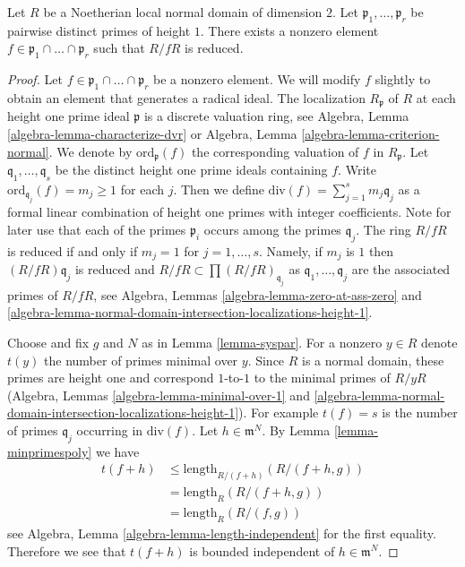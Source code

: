 \begin{lemma}
\label{lemma-radical-element}
Let $R$ be a Noetherian local normal domain of dimension $2$.
Let $\mathfrak p_1, \ldots, \mathfrak p_r$ be pairwise distinct
primes of height $1$. There exists a nonzero element
$f \in \mathfrak p_1 \cap \ldots \cap \mathfrak p_r$ such
that $R/fR$ is reduced.
\end{lemma}

\begin{proof}
Let $f \in \mathfrak p_1 \cap \ldots \cap \mathfrak p_r$ be a nonzero element.
We will modify $f$ slightly to obtain an element that generates a radical ideal.
The localization $R_\mathfrak p$ of $R$ at each height one prime
ideal $\mathfrak p$ is a discrete valuation ring, see
Algebra, Lemma \ref{algebra-lemma-characterize-dvr} or
Algebra, Lemma \ref{algebra-lemma-criterion-normal}.
We denote by $\text{ord}_\mathfrak p(f)$ the corresponding
valuation of $f$ in $R_{\mathfrak p}$. Let
$\mathfrak q_1, \ldots, \mathfrak q_s$
be the distinct height one prime ideals containing $f$.
Write $\text{ord}_{\mathfrak q_j}(f) = m_j \geq 1$ for each $j$.
Then we define $\text{div}(f) = \sum_{j = 1}^s m_j\mathfrak q_j$
as a formal linear combination of
height one primes with integer coefficients.
Note for later use that each of the primes $\mathfrak p_i$
occurs among the primes $\mathfrak q_j$.
The ring $R/fR$ is reduced if and only if
$m_j = 1$ for $j = 1, \ldots, s$. Namely, if $m_j$ is $1$ then
$(R/fR)\mathfrak q_j$ is reduced and
$R/fR \subset \prod (R/fR)_{\mathfrak q_j}$ as
$\mathfrak q_1, \ldots, \mathfrak q_j$ are the associated primes
of $R/fR$, see Algebra, Lemmas
\ref{algebra-lemma-zero-at-ass-zero} and
\ref{algebra-lemma-normal-domain-intersection-localizations-height-1}.

\medskip\noindent
Choose and fix $g$ and $N$ as in Lemma \ref{lemma-syspar}.
For a nonzero $y \in R$ denote $t(y)$ the number of primes minimal over $y$.
Since $R$ is a normal domain, these primes
are height one and correspond $1$-to-$1$ to the minimal primes of
$R/yR$ (Algebra, Lemmas \ref{algebra-lemma-minimal-over-1} and
\ref{algebra-lemma-normal-domain-intersection-localizations-height-1}).
For example $t(f) = s$ is the number
of primes $\mathfrak q_j$ occurring in $\text{div}(f)$.
Let $h \in \mathfrak m^N$. By Lemma \ref{lemma-minprimespoly} we have
\begin{align*}
t(f + h) & \leq \text{length}_{R/(f + h)}(R/(f + h, g)) \\
& = \text{length}_R(R/(f + h, g)) \\
& = \text{length}_R(R/(f, g))
\end{align*}
see Algebra, Lemma \ref{algebra-lemma-length-independent}
for the first equality.
Therefore we see that $t(f + h)$ is bounded independent of
$h \in \mathfrak m^N$.


\end{proof}
